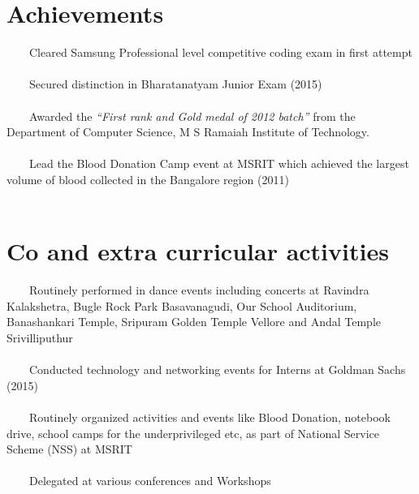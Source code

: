 \documentclass[a4paper,10pt]{article} %
\newcommand{\tabitem}{~~\llap{\textbullet}~~}
\begin{document}

\section{Achievements}
\tabitem Cleared Samsung Professional level competitive coding exam in first 
attempt \\
\\
\tabitem Secured distinction in Bharatanatyam Junior Exam (2015)  \\
\\
\tabitem Awarded the \textit{“First rank and Gold medal of 2012 batch”} from 
the Department of Computer Science, M S Ramaiah Institute of Technology.\\
\\
\tabitem Lead the Blood Donation Camp event at MSRIT which achieved the largest 
volume of blood collected in the Bangalore region (2011)\\
\\


\section{Co and extra curricular activities}
\tabitem Routinely performed in dance events including concerts at Ravindra 
Kalakshetra, Bugle Rock Park Basavanagudi, Our School Auditorium, Banashankari 
Temple, Sripuram Golden Temple Vellore and Andal Temple Srivilliputhur\\
\\
\tabitem Conducted technology and networking events for Interns at Goldman 
Sachs (2015)\\
\\
\tabitem Routinely organized activities and events like Blood Donation, 
notebook drive, school camps for the underprivileged etc, as part of National 
Service Scheme (NSS) at MSRIT\\
\\ 
\tabitem Delegated at various conferences and Workshops\\
\end{document}
